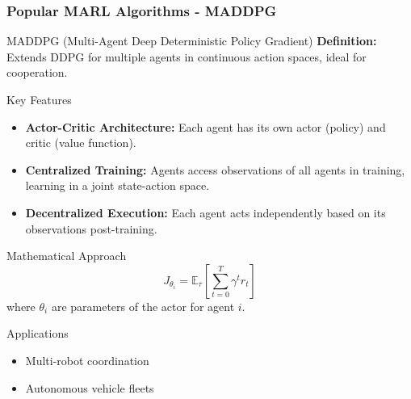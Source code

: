 \documentclass[aspectratio=169]{beamer}
\begin{document}
\begin{frame}[fragile]
    \frametitle{Popular MARL Algorithms - MADDPG}
    \begin{block}{MADDPG (Multi-Agent Deep Deterministic Policy Gradient)}
        \textbf{Definition:} Extends DDPG for multiple agents in continuous action spaces, ideal for cooperation.
    \end{block}
    \begin{block}{Key Features}
        \begin{itemize}
            \item \textbf{Actor-Critic Architecture:} Each agent has its own actor (policy) and critic (value function).
            \item \textbf{Centralized Training:} Agents access observations of all agents in training, learning in a joint state-action space.
            \item \textbf{Decentralized Execution:} Each agent acts independently based on its observations post-training.
        \end{itemize}
    \end{block}
    \begin{block}{Mathematical Approach}
        \begin{equation}
            J_{\theta_i} = \mathbb{E}_{\tau}\left[ \sum_{t=0}^{T} \gamma^t r_t \right]
        \end{equation}
        where \( \theta_i \) are parameters of the actor for agent \( i \).
    \end{block}
    \begin{block}{Applications}
        \begin{itemize}
            \item Multi-robot coordination
            \item Autonomous vehicle fleets
        \end{itemize}
    \end{block}
\end{frame}
\end{document}
